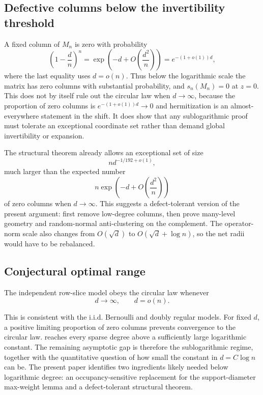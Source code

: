 \subsection{Defective columns below the invertibility threshold}

A fixed column of $M_n$ is zero with probability
\[
  \left(1-\frac dn\right)^n
  =\exp\!\left(-d+O\!\left(\frac{d^2}{n}\right)\right)
  =e^{-(1+o(1))d},
\]
where the last equality uses $d=o(n)$. Thus below the logarithmic scale the matrix has zero columns with substantial probability, and $s_n(M_n)=0$ at $z=0$. This does not by itself rule out the circular law when $d\to\infty$, because the proportion of zero columns is $e^{-(1+o(1))d}\to0$ and hermitization is an almost-everywhere statement in the shift. It does show that any sublogarithmic proof must tolerate an exceptional coordinate set rather than demand global invertibility or expansion.

The structural theorem already allows an exceptional set of size
\[
  n d^{-1/192+o(1)},
\]
much larger than the expected number
\[
  n\exp\!\left(-d+O\!\left(\frac{d^2}{n}\right)\right)
\]
of zero columns when $d\to\infty$. This suggests a defect-tolerant version of the present argument: first remove low-degree columns, then prove many-level geometry and random-normal anti-clustering on the complement. The operator-norm scale also changes from $O(\sqrt d)$ to $O(\sqrt d+\log n)$, so the net radii would have to be rebalanced.

\subsection{Conjectural optimal range}

\begin{conjecture}
The independent row-slice model obeys the circular law whenever
\[
  d\to\infty,
  \qquad
  d=o(n).
\]
\end{conjecture}

This is consistent with the i.i.d. Bernoulli and doubly regular models. For fixed $d$, a positive limiting proportion of zero columns prevents convergence to the circular law.  reaches every sparse degree above a sufficiently large logarithmic constant. The remaining asymptotic gap is therefore the sublogarithmic regime, together with the quantitative question of how small the constant in $d=C\log n$ can be. The present paper identifies two ingredients likely needed below logarithmic degree: an occupancy-sensitive replacement for the support-diameter max-weight lemma and a defect-tolerant structural theorem.
